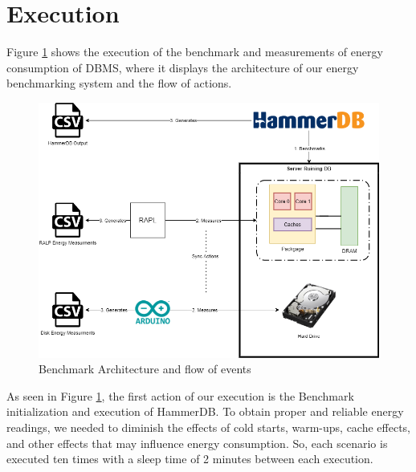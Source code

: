\section{Execution}
\label{sc:execution}





Figure \ref{fig:arch} shows the execution of the benchmark and measurements of energy consumption of DBMS, where it displays the architecture of our energy benchmarking system and the flow of actions.



\begin{figure}[H]
  \centering
  \includegraphics[width=\linewidth]{Chapters/images/arquitetura.png}
      \caption{Benchmark Architecture and flow of events}
  \label{fig:arch}
\end{figure}




As seen in Figure \ref{fig:arch}, the first action of our execution is the Benchmark initialization and execution of HammerDB. To obtain proper and reliable energy readings, we needed to diminish the effects of cold starts, warm-ups, cache effects, and other effects that may influence energy consumption. So, each scenario is executed ten times with a sleep time of 2 minutes between each execution.



